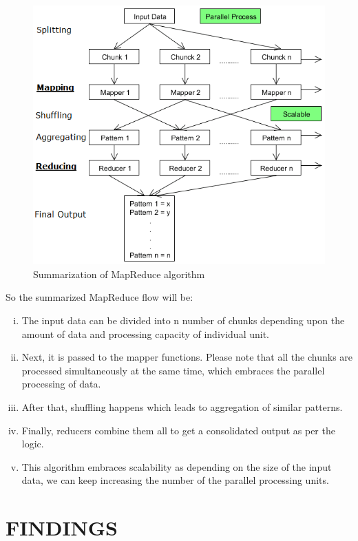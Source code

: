 \documentclass[a4paper,12pt,oneside]{report}
\begin{document}
\begin{figure}[h!]
        \centering
        \includegraphics[width=170mm]{mapreducealgorithm}
        \caption{Summarization of MapReduce algorithm}
\end{figure}
So the summarized MapReduce flow will be:
\begin{enumerate}[(i)]
        \item The input data can be divided into n number of chunks depending upon the amount of data and processing capacity of individual unit.
        \item Next, it is passed to the mapper functions. Please note that all the chunks are processed simultaneously at the same time, which embraces the parallel processing of data.
        \item After that, shuffling happens which leads to aggregation of similar patterns.
        \item Finally, reducers combine them all to get a consolidated output as per the logic.
        \item This algorithm embraces scalability as depending on the size of the input data, we can keep increasing the number of the parallel processing units.
\end{enumerate}


\newpage
\section{FINDINGS}
\end{document}
